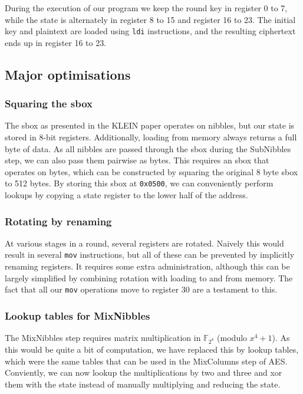 \documentclass[a4paper]{article}
\begin{document}
During the execution of our program we keep the round key in register 0 to 7, while the state is alternately in register 8 to 15 and register 16 to 23. The initial key and plaintext are loaded using {\tt ldi} instructions, and the resulting ciphertext ends up in register 16 to 23.

\subsection{Major optimisations}

\subsubsection{Squaring the sbox}

The sbox as presented in the KLEIN paper operates on nibbles, but our state is stored in 8-bit registers. Additionally, loading from memory always returns a full byte of data. As all nibbles are passed through the sbox during the SubNibbles step, we can also pass them pairwise as bytes. This requires an sbox that operates on bytes, which can be constructed by squaring the original 8 byte sbox to 512 bytes. By storing this sbox at {\tt 0x0500}, we can conveniently perform lookups by copying a state register to the lower half of the address.

\subsubsection{Rotating by renaming}

At various stages in a round, several registers are rotated. Naively this would result in several {\tt mov} instructions, but all of these can be prevented by implicitly renaming registers. It requires some extra administration, although this can be largely simplified by combining rotation with loading to and from memory. The fact that all our {\tt mov} operations move to register 30 are a testament to this.

\subsubsection{Lookup tables for MixNibbles}

The MixNibbles step requires matrix multiplication in $\mathbb{F}_{2^8}$ (modulo $x^4 + 1$). As this would be quite a bit of computation, we have replaced this by lookup tables, which were the same tables that can be used in the MixColumns step of AES. Conviently, we can now lookup the multiplications by two and three and xor them with the state instead of manually multiplying and reducing the state. 
\end{document}
